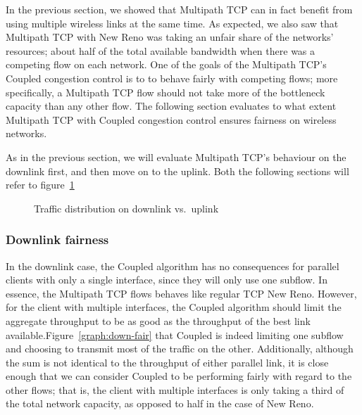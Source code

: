 In the previous section, we showed that Multipath TCP can in fact benefit from
using multiple wireless links at the same time. As expected, we also saw that
Multipath TCP with New Reno was taking an unfair share of the networks'
resources; about half of the total available bandwidth when there was a
competing flow on each network. One of the goals of the Multipath TCP's Coupled
congestion control is to to behave fairly with competing flows; more
specifically, a Multipath TCP flow should not take more of the bottleneck
capacity than any other flow. The following section evaluates to what extent
Multipath TCP with Coupled congestion control ensures fairness on wireless
networks.

As in the previous section, we will evaluate Multipath TCP's behaviour on the
downlink first, and then move on to the uplink. Both the following sections will
refer to figure~\ref{graph:fairness}

\begin{figure}[h]
 \centering
 \subfloat[][downlink] {\
   \scalebox{0.55}{}\label{graph:down-fair}
 }
 \subfloat[][uplink] {\
   \scalebox{0.55}{}\label{graph:up-fair}
 }

 \caption{Traffic distribution on downlink vs.\ uplink}\label{graph:fairness}
\end{figure}

\subsubsection{Downlink fairness}
In the downlink case, the Coupled algorithm has no consequences for parallel
clients with only a single interface, since they will only use one subflow. In
essence, the Multipath TCP flows behaves like regular TCP New Reno. However, for
the client with multiple interfaces, the Coupled algorithm should limit the
aggregate throughput to be as good as the throughput of the best link
available.\@ Figure~\ref{graph:down-fair} that Coupled is indeed limiting one
subflow and choosing to transmit most of the traffic on the other. Additionally,
although the sum is not identical to the throughput of either parallel link, it
is close enough that we can consider Coupled to be performing fairly with regard
to the other flows; that is, the client with multiple interfaces is only taking
a third of the total network capacity, as opposed to half in the case of New
Reno.

